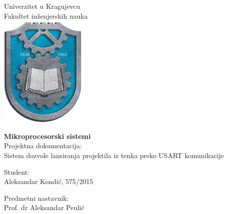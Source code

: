 \documentclass[a4paper, 12pt, oneside, titlepage]{article}
\begin{document}
    \pagestyle{fancy}
    
    \renewcommand{\headrulewidth}{1pt}
    \renewcommand{\footrulewidth}{0pt}
    \fancyhf{}
    \rfoot{\thepage}
    
    {
	\fancyhf{}
	\renewcommand{\headrulewidth}{0pt}
	\renewcommand{\footrulewidth}{1pt}
    }
    
    \begin{titlepage}
	\thispagestyle{titlepage}
	
	\begin{center}
	
	Univerzitet u Kragujevcu\\
	Fakultet inženjerskih nauka\\
	\vspace{50px}
	\includegraphics[scale=2]{slike/logo}\\
	
	\vspace{160px}
	
	\textbf{\huge Mikroprocesorski sistemi}\\
	\vspace{40px}
	{\LARGE Projektna dokumentacija:}\\
	\vspace{10px}
	{\Large Sistem dozvole lansiranja projektila iz tenka preko USART komunikacije}
	
	\end{center}
	
	\vfill
	
	\begin{minipage}{.3\textwidth}
	\begin{flushleft}
	    Student:\\
	    Aleksandar Kondić,
	    575/2015
	\end{flushleft}
	\end{minipage}
	\hfill
	\begin{minipage}{.25\textwidth}
	\begin{flushright}
	    Predmetni nastavnik:\\
	    Prof. dr Aleksandar Peulić\\
	\end{flushright}
	\end{minipage}
	\vspace{20px}
	
	\clearpage
	
    \end{titlepage}
    
\end{document}
